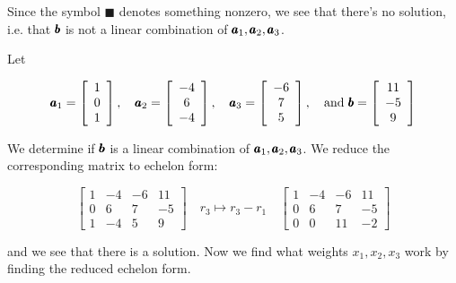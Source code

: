 \begin{example}
Since the symbol $\blacksquare$ denotes something nonzero, we see that there's no solution, i.e. that $\pmb{b}$ is not a linear combination of $\pmb{a}_1, \pmb{a}_2, \pmb{a}_3$.

\end{example}

\begin{example} Let

\[
\pmb{a}_1 = \left[\begin{array}{l}
1 \\
0 \\
1
\end{array}\right], \quad
\pmb{a}_2 = \left[\begin{array}{c}
-4 \\
6 \\
-4
\end{array}\right], \quad
\pmb{a}_3 = \left[\begin{array}{c}
-6 \\
7 \\
5
\end{array}\right], \quad
\text{and } \pmb{b} = \left[\begin{array}{c}
11 \\
-5 \\
9
\end{array}\right]
\]

We determine if $\pmb{b}$ is a linear combination of $\pmb{a}_1, \pmb{a}_2, \pmb{a}_3$. We reduce the corresponding matrix to echelon form:

\[
\left[\begin{array}{cccc}
1 & -4 & -6 & 11 \\
0 & 6 & 7 & -5 \\
1 & -4 & 5 & 9
\end{array}\right]
\quad r_3 \mapsto r_3 - r_1 \quad
\left[\begin{array}{cccc}
1 & -4 & -6 & 11 \\
0 & 6 & 7 & -5 \\
0 & 0 & 11 & -2
\end{array}\right]
\]

and we see that there is a solution. Now we find what weights $x_1, x_2, x_3$ work by finding the reduced echelon form.


\end{example}
